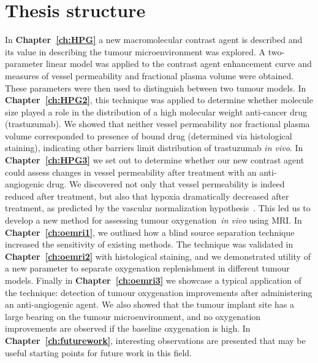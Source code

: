 \section{Thesis structure}

In \textbf{Chapter~\ref{ch:HPG}} a new macromolecular contrast agent is described and its value in describing the tumour microenvironment was explored.
A two-parameter linear model was applied to the contrast agent enhancement curve and measures of vessel permeability and fractional plasma volume were obtained.
These parameters were then used to distinguish between two tumour models.
In \textbf{Chapter~\ref{ch:HPG2}}, this technique was applied to determine whether molecule size played a role in the distribution of a high molecular weight anti-cancer drug (trastuzumab).
We showed that neither vessel permeability nor fractional plasma volume corresponded to presence of bound drug (determined via histological staining), indicating other barriers limit distribution of trastuzumab \emph{in vivo}.
In \textbf{Chapter~\ref{ch:HPG3}} we set out to determine whether our new contrast agent could assess changes in vessel permeability after treatment with an anti-angiogenic drug.
We discovered not only that vessel permeability is indeed reduced after treatment, but also that hypoxia dramatically decreased after treatment, as predicted by the vascular normalization hypothesis~\cite{Jain:2005gk}. 
This led us to develop a new method for assessing tumour oxygenation~\emph{in vivo} using MRI.
In \textbf{Chapter~\ref{ch:oemri1}}, we outlined how a blind source separation technique increased the sensitivity of existing methods. 
The technique was validated in \textbf{Chapter~\ref{ch:oemri2}} with histological staining, and we demonstrated utility of a new parameter to separate oxygenation replenishment in different tumour models.
Finally in \textbf{Chapter~\ref{ch:oemri3}} we showcase a typical application of the technique: detection of tumour oxygenation improvements after administering an anti-angiogenic agent. 
We also showed that the tumour implant site has a large bearing on the tumour microenvironment, and no oxygenation improvements are observed if the baseline oxygenation is high.
In \textbf{Chapter~\ref{ch:futurework}}, interesting observations are presented that may be useful starting points for future work in this field.